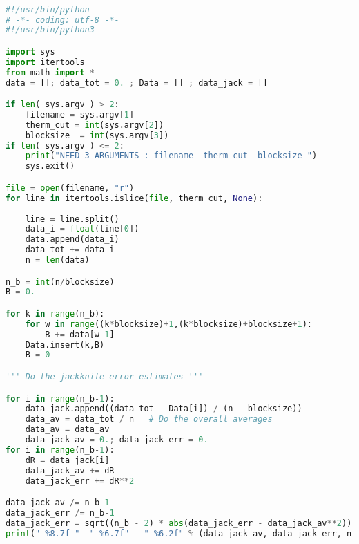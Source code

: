\begin{footnotesize} 
\begin{lstlisting}[language=Python]

#!/usr/bin/python
# -*- coding: utf-8 -*-
#!/usr/bin/python3

import sys
import itertools 
from math import *
data = []; data_tot = 0. ; Data = [] ; data_jack = []

if len( sys.argv ) > 2:
    filename = sys.argv[1]
    therm_cut = int(sys.argv[2])
    blocksize  = int(sys.argv[3])
if len( sys.argv ) <= 2:
    print("NEED 3 ARGUMENTS : filename  therm-cut  blocksize ")
    sys.exit()

file = open(filename, "r")
for line in itertools.islice(file, therm_cut, None):
    
    line = line.split()
    data_i = float(line[0])
    data.append(data_i)
    data_tot += data_i
    n = len(data)

n_b = int(n/blocksize)
B = 0.

for k in range(n_b):
    for w in range((k*blocksize)+1,(k*blocksize)+blocksize+1):
        B += data[w-1]
    Data.insert(k,B)
    B = 0

''' Do the jackknife error estimates '''

for i in range(n_b-1):
    data_jack.append((data_tot - Data[i]) / (n - blocksize))
    data_av = data_tot / n   # Do the overall averages
    data_av = data_av
    data_jack_av = 0.; data_jack_err = 0.
for i in range(n_b-1):
    dR = data_jack[i]
    data_jack_av += dR
    data_jack_err += dR**2

data_jack_av /= n_b-1
data_jack_err /= n_b-1
data_jack_err = sqrt((n_b - 2) * abs(data_jack_err - data_jack_av**2))
print(" %8.7f "  " %6.7f"   " %6.2f" % (data_jack_av, data_jack_err, n_b))

\end{lstlisting}
\end{footnotesize} 